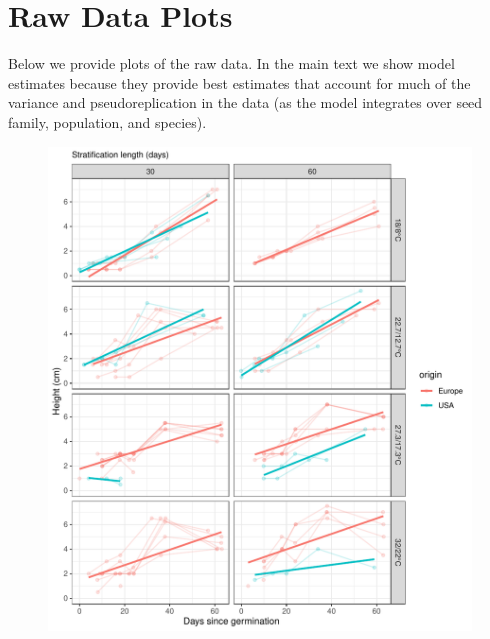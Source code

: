 \documentclass[12pt]{article}\usepackage[]{graphicx}\usepackage[]{color}
\begin{document}
\section{Raw Data Plots}
Below we provide plots of the raw data. In the main text we show model estimates because they provide best estimates that account for much of the variance and pseudoreplication in the data (as the model integrates over seed family, population, and species). %
\begin{figure}[H]
  \centering
  {\includegraphics[scale=.5, page=1, trim=0cm 0cm 2.9cm 0cm, clip=TRUE]{supplement.pdf}}

\end{figure}
\end{document}
